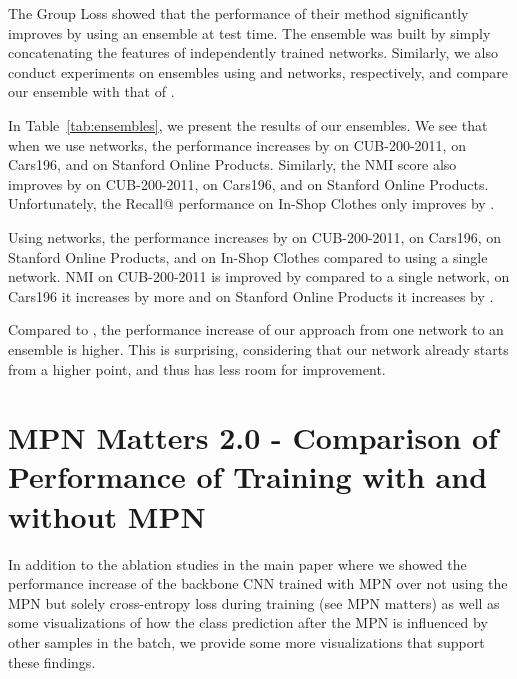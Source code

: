 \documentclass{article}
\begin{document}
\iffalse
CUB-200-2011 & 72.2 & 74.3 & 73.1 & 74.4 \\
Cars196 & 90.9 & 74.9 & 91.5 & 75.4 \\
Stanford Online Products & 81.8 & 92.7 & 82.1 & 92.8 \\
In-Shop Clothes & 92.9 & - & 93.4 &  \\
\fi 


The Group Loss \cite{DBLP:conf/eccv/GrLoss} showed that the performance of their method significantly improves by using an ensemble at test time. The ensemble was built by simply concatenating the features of  independently trained networks. Similarly, we also conduct experiments on ensembles using  and  networks, respectively, and compare our ensemble with that of \cite{DBLP:conf/eccv/GrLoss}.

In Table~\ref{tab:ensembles}, we present the results of our ensembles. We see that when we use  networks, the performance increases by  on CUB-200-2011,  on Cars196, and  on Stanford Online Products.  Similarly, the NMI score also improves by  on CUB-200-2011,  on Cars196, and  on Stanford Online Products. Unfortunately, the Recall@ performance on In-Shop Clothes only improves by .

Using  networks, the performance increases by  on CUB-200-2011,  on Cars196,  on Stanford Online Products, and  on In-Shop Clothes compared to using a single network. NMI on CUB-200-2011 is improved by  compared to a single network, on Cars196 it increases by  more and on Stanford Online Products it increases by .

Compared to \cite{DBLP:conf/eccv/GrLoss}, the performance increase of our approach from one network to an ensemble is higher. This is surprising, considering that our network already starts from a higher point, and thus has less room for improvement.
\fi




\section{MPN Matters 2.0 - Comparison of Performance of Training with and without MPN}
\label{sec:MPN_matters}
In addition to the ablation studies in the main paper where we showed the performance increase of the backbone CNN trained with MPN over not using the MPN but solely cross-entropy loss during training (see MPN matters) as well as some visualizations of how the class prediction after the MPN is influenced by other samples in the batch, we provide some more visualizations that support these findings. 
\end{document}

